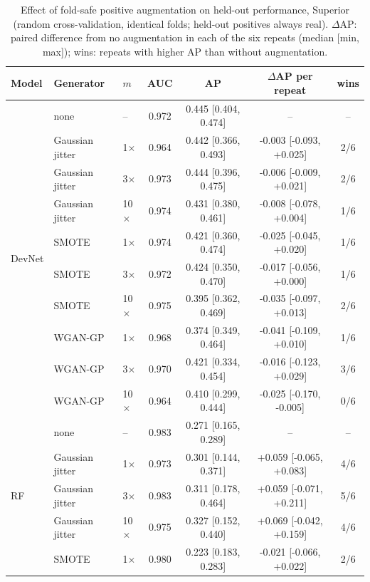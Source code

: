 \documentclass[pdflatex,sn-apa]{sn-jnl}
\begin{document}
\begin{table}[t]
\caption{Effect of fold-safe positive augmentation on held-out performance, Superior (random cross-validation, identical folds; held-out positives always real). $\Delta$AP: paired difference from no augmentation in each of the six repeats (median [min, max]); wins: repeats with higher AP than without augmentation.}\label{tab:augmentation}
\scriptsize
\setlength{\tabcolsep}{2.5pt}
\begin{tabular*}{\textwidth}{@{\extracolsep\fill}lllcccc}
\toprule
Model & Generator & $m$ & AUC & AP & $\Delta$AP per repeat & wins \\
\midrule
\multirow{10}{*}{DevNet} & none & -- & 0.972 & 0.445 [0.404, 0.474] & -- & -- \\
 & Gaussian jitter & 1$\times$ & 0.964 & 0.442 [0.366, 0.493] & -0.003 [-0.093, +0.025] & 2/6 \\
 & Gaussian jitter & 3$\times$ & 0.973 & 0.444 [0.396, 0.475] & -0.006 [-0.009, +0.021] & 2/6 \\
 & Gaussian jitter & 10$\times$ & 0.974 & 0.431 [0.380, 0.461] & -0.008 [-0.078, +0.004] & 1/6 \\
 & SMOTE & 1$\times$ & 0.974 & 0.421 [0.360, 0.474] & -0.025 [-0.045, +0.020] & 1/6 \\
 & SMOTE & 3$\times$ & 0.972 & 0.424 [0.350, 0.470] & -0.017 [-0.056, +0.000] & 1/6 \\
 & SMOTE & 10$\times$ & 0.975 & 0.395 [0.362, 0.469] & -0.035 [-0.097, +0.013] & 2/6 \\
 & WGAN-GP & 1$\times$ & 0.968 & 0.374 [0.349, 0.464] & -0.041 [-0.109, +0.010] & 1/6 \\
 & WGAN-GP & 3$\times$ & 0.970 & 0.421 [0.334, 0.454] & -0.016 [-0.123, +0.029] & 3/6 \\
 & WGAN-GP & 10$\times$ & 0.964 & 0.410 [0.299, 0.444] & -0.025 [-0.170, -0.005] & 0/6 \\
\midrule
\multirow{10}{*}{RF} & none & -- & 0.983 & 0.271 [0.165, 0.289] & -- & -- \\
 & Gaussian jitter & 1$\times$ & 0.973 & 0.301 [0.144, 0.371] & +0.059 [-0.065, +0.083] & 4/6 \\
 & Gaussian jitter & 3$\times$ & 0.983 & 0.311 [0.178, 0.464] & +0.059 [-0.071, +0.211] & 5/6 \\
 & Gaussian jitter & 10$\times$ & 0.975 & 0.327 [0.152, 0.440] & +0.069 [-0.042, +0.159] & 4/6 \\
 & SMOTE & 1$\times$ & 0.980 & 0.223 [0.183, 0.283] & -0.021 [-0.066, +0.022] & 2/6 \\

\end{tabular*}
\end{table}
\end{document}
